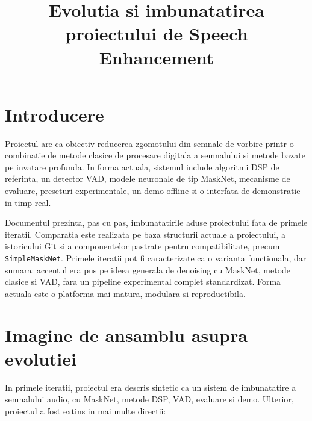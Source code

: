 \documentclass[12pt,a4paper]{article}
\title{Evolutia si imbunatatirea proiectului de Speech Enhancement}
\author{}
\date{}
\begin{document}
\maketitle
\tableofcontents
\newpage

\section{Introducere}

Proiectul are ca obiectiv reducerea zgomotului din semnale de vorbire printr-o
combinatie de metode clasice de procesare digitala a semnalului si metode bazate
pe invatare profunda. In forma actuala, sistemul include algoritmi DSP de
referinta, un detector VAD, modele neuronale de tip MaskNet, mecanisme de
evaluare, preseturi experimentale, un demo offline si o interfata de demonstratie
in timp real.

Documentul prezinta, pas cu pas, imbunatatirile aduse proiectului fata de primele
iteratii. Comparatia este realizata pe baza structurii actuale a proiectului, a
istoricului Git si a componentelor pastrate pentru compatibilitate, precum
\texttt{SimpleMaskNet}. Primele iteratii pot fi caracterizate ca o varianta
functionala, dar sumara: accentul era pus pe ideea generala de denoising cu
MaskNet, metode clasice si VAD, fara un pipeline experimental complet standardizat.
Forma actuala este o platforma mai matura, modulara si reproductibila.

\section{Imagine de ansamblu asupra evolutiei}

In primele iteratii, proiectul era descris sintetic ca un sistem de imbunatatire a
semnalului audio, cu MaskNet, metode DSP, VAD, evaluare si demo. Ulterior,
proiectul a fost extins in mai multe directii:
\end{document}
